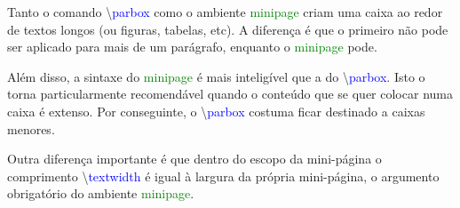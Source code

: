 \documentclass[a4paper,12pt]{article}
\newcommand{\comando}[1]{{\textbackslash\textcolor{blue}{#1}}}
\newcommand{\ambiente}[1]{{\textcolor{green}{#1}}}
\begin{document}
		
	\noindent\hrulefill
	\begin{minipage}[c]{0.5\textwidth}
		\setlength{\parindent}{1em}
	
		\tiny
		Tanto o comando \comando{parbox} como o ambiente \ambiente{minipage} criam uma caixa ao redor de textos longos (ou figuras, tabelas, etc). A diferença é que o primeiro não pode ser aplicado para mais de um parágrafo, enquanto	o \ambiente{minipage} pode.
		
		Além disso, a sintaxe do \ambiente{minipage} é mais inteligível que a do \comando{parbox}. Isto o torna particularmente recomendável quando o conteúdo que se quer colocar numa caixa é extenso. Por conseguinte, o \comando{parbox} costuma ficar destinado a caixas menores.
		
		Outra diferença importante é que dentro do escopo da mini-página o comprimento \comando{textwidth} é igual à largura da própria mini-página, o argumento obrigatório do ambiente \ambiente{minipage}.
	\end{minipage}%
	\hrulefill
	\hrulefill
	
\end{document}
